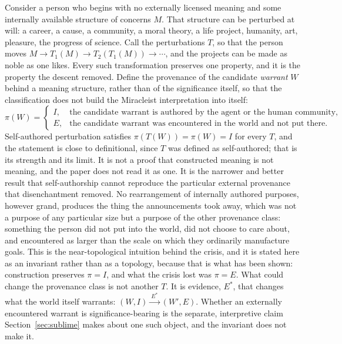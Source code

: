 Consider a person who begins with no externally licensed meaning and
some internally available structure of concerns $M$. That structure can
be perturbed at will: a career, a cause, a community, a moral theory, a
life project, humanity, art, pleasure, the progress of science. Call
the perturbations $T$, so that the person moves $M\to T_1(M)\to
T_2(T_1(M))\to\cdots$, and the projects can be made as noble as one
likes. Every such transformation preserves one property, and it is the
property the descent removed. Define the provenance of the
candidate \emph{warrant} $W$ behind a meaning structure, rather than of
the significance itself, so that the classification does not build the
Miracleist interpretation into itself:
\[
\pi(W)=\begin{cases} I,&\text{the candidate warrant is authored by the agent or the human community,}\\
E,&\text{the candidate warrant was encountered in the world and not put there.}\end{cases}
\]
Self-authored perturbation satisfies $\pi(T(W))=\pi(W)=I$ for every $T$,
and the statement is close to definitional, since $T$ was defined as
self-authored; that is its strength and its limit. It is not a proof
that constructed meaning is not meaning, and the paper does not read it
as one. It is the narrower and better result that self-authorship
cannot reproduce the particular external provenance that disenchantment
removed. No rearrangement of internally authored purposes, however
grand, produces the thing the announcements took away, which was not a
purpose of any particular size but a purpose of the other provenance
class:
something the person did not put into the world, did not choose to care
about, and encountered as larger than the scale on which they
ordinarily manufacture goals. This is the near-topological intuition
behind the crisis, and it is stated here as an invariant rather than as
a topology, because that is what has been shown: construction preserves
$\pi=I$, and what the crisis lost was $\pi=E$. What could change the
provenance class is not another $T$. It is evidence, $E^\ast$, that
changes what the world itself warrants: $(W,I)\xrightarrow{\ E^\ast\ }
(W',E)$. Whether an externally encountered warrant is
significance-bearing is the separate, interpretive claim
Section~\ref{sec:sublime} makes about one such object, and the
invariant does not make it.

